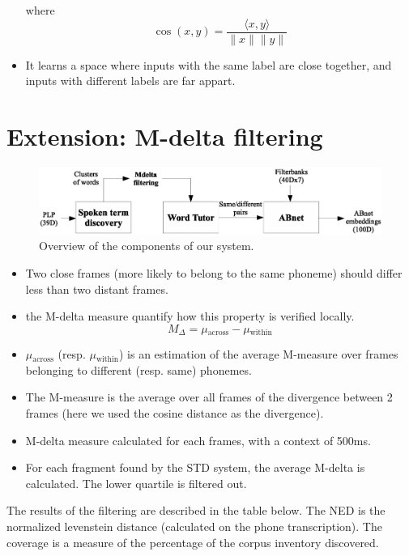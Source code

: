 \documentclass[final]{beamer}
\newcommand{\norm}[1]{\lVert#1\rVert}
\newcommand{\tup}[1]{\langle#1\rangle}
\begin{document}
\begin{frame}[t]
\begin{multicols}{3}
\begin{itemize}
\noindent        
where $$\cos(x, y) = \frac{\tup{x, y}}{\norm{x}\norm{y}}$$

\item It learns a space where inputs with the same label are close together, and inputs with different labels are far appart. 
\end{itemize}


\section{Extension: M-delta filtering}

\begin{figure}[ht!]
  \begin{center}
    \includegraphics[width=\columnwidth]{system_mdelta}
    \caption{\label{fig:system}Overview of the components of our system.}
  \end{center}
\end{figure}

\begin{itemize}
\item Two close frames (more likely to belong to the same phoneme) should differ less than two distant frames.
\item the M-delta measure quantify how this property is verified locally.
$$M_\Delta = \mu{}_{\mathrm{across}} - \mu{}_{\mathrm{within}}$$
\item $\mu{}_{\mathrm{across}}$ (resp. $\mu{}_{\mathrm{within}}$) is an estimation of the average M-measure over frames belonging to different (resp. same) phonemes.
\item The M-measure is the average over all frames of the divergence between 2 frames (here we used the cosine distance as the divergence).
\end{itemize}

\vspace{1cm}
\begin{itemize}
\item M-delta measure calculated for each frames, with a context of 500ms.
\item For each fragment found by the STD system, the average M-delta is calculated. The lower quartile is filtered out.
\end{itemize}
The results of the filtering are described in the table below. The NED is the normalized levenstein distance (calculated on the phone transcription). The coverage is a measure of the percentage of the corpus inventory discovered.


\end{multicols}
\end{frame}
\end{document}
